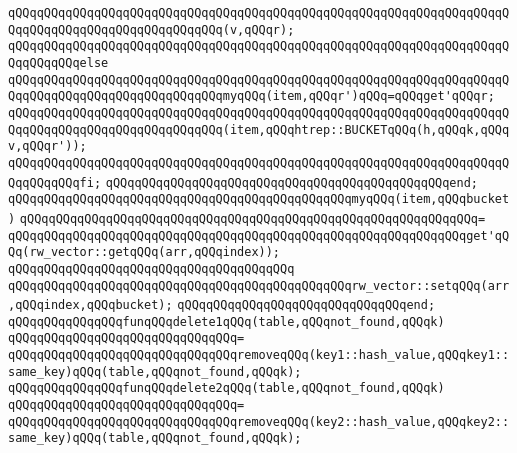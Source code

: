\verb|qQQqqQQqqQQqqQQqqQQqqQQqqQQqqQQqqQQqqQQqqQQqqQQqqQQqqQQqqQQqqQQqqQQqqQQqqQQqqQQqqQQqqQQqqQQqqQQqqQQq(v,qQQqr);|\newline
\verb|qQQqqQQqqQQqqQQqqQQqqQQqqQQqqQQqqQQqqQQqqQQqqQQqqQQqqQQqqQQqqQQqqQQqqQQqqQQqqQQqelse|\newline
\verb|qQQqqQQqqQQqqQQqqQQqqQQqqQQqqQQqqQQqqQQqqQQqqQQqqQQqqQQqqQQqqQQqqQQqqQQqqQQqqQQqqQQqqQQqqQQqqQQqqQQqmyqQQq(item,qQQqr')qQQq=qQQqget'qQQqr;|\newline
\verb|qQQqqQQqqQQqqQQqqQQqqQQqqQQqqQQqqQQqqQQqqQQqqQQqqQQqqQQqqQQqqQQqqQQqqQQqqQQqqQQqqQQqqQQqqQQqqQQqqQQq(item,qQQqhtrep::BUCKETqQQq(h,qQQqk,qQQqv,qQQqr'));|\newline
\verb|qQQqqQQqqQQqqQQqqQQqqQQqqQQqqQQqqQQqqQQqqQQqqQQqqQQqqQQqqQQqqQQqqQQqqQQqqQQqqQQqfi;|\newline
\verb|qQQqqQQqqQQqqQQqqQQqqQQqqQQqqQQqqQQqqQQqqQQqqQQqend;|\newline
\newline
\verb|qQQqqQQqqQQqqQQqqQQqqQQqqQQqqQQqqQQqqQQqqQQqqQQqmyqQQq(item,qQQqbucket)|\newline
\verb|qQQqqQQqqQQqqQQqqQQqqQQqqQQqqQQqqQQqqQQqqQQqqQQqqQQqqQQqqQQqqQQq=|\newline
\verb|qQQqqQQqqQQqqQQqqQQqqQQqqQQqqQQqqQQqqQQqqQQqqQQqqQQqqQQqqQQqqQQqget'qQQq(rw_vector::getqQQq(arr,qQQqindex));|\newline
\verb|qQQqqQQqqQQqqQQqqQQqqQQqqQQqqQQqqQQqqQQq|\newline
\verb|qQQqqQQqqQQqqQQqqQQqqQQqqQQqqQQqqQQqqQQqqQQqqQQqrw_vector::setqQQq(arr,qQQqindex,qQQqbucket);|\newline
\verb|qQQqqQQqqQQqqQQqqQQqqQQqqQQqqQQqend;|\newline
\newline
\newline
\verb|qQQqqQQqqQQqqQQqfunqQQqdelete1qQQq(table,qQQqnot_found,qQQqk)|\newline
\verb|qQQqqQQqqQQqqQQqqQQqqQQqqQQqqQQq=|\newline
\verb|qQQqqQQqqQQqqQQqqQQqqQQqqQQqqQQqremoveqQQq(key1::hash_value,qQQqkey1::same_key)qQQq(table,qQQqnot_found,qQQqk);|\newline
\newline
\newline
\verb|qQQqqQQqqQQqqQQqfunqQQqdelete2qQQq(table,qQQqnot_found,qQQqk)|\newline
\verb|qQQqqQQqqQQqqQQqqQQqqQQqqQQqqQQq=|\newline
\verb|qQQqqQQqqQQqqQQqqQQqqQQqqQQqqQQqremoveqQQq(key2::hash_value,qQQqkey2::same_key)qQQq(table,qQQqnot_found,qQQqk);|\newline
